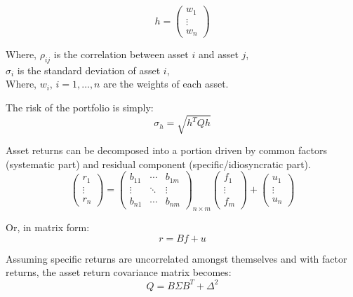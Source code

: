 \documentclass{article}
\begin{document}
\begin{equation}
h = \begin{pmatrix}
w_1 \\
\vdots \\
w_n
\end{pmatrix}
\end{equation}

Where, \( \rho_{ij} \) is the correlation between asset \( i \) and asset \( j \), \\
\( \sigma_i \) is the standard deviation of asset \( i \), \\
Where, \( w_i \), \( i = 1, \ldots, n \) are the weights of each asset.

The risk of the portfolio is simply:
\begin{equation}
    \sigma_h = \sqrt{h^T Q h}
\end{equation}

Asset returns can be decomposed into a portion driven by common factors (systematic part) and residual component (specific/idiosyncratic part).
\begin{equation}
\begin{pmatrix}
r_1 \\
\vdots \\
r_n
\end{pmatrix}
=
\begin{pmatrix}
b_{11} & \cdots & b_{1m} \\
\vdots & \ddots & \vdots \\
b_{n1} & \cdots & b_{nm}
\end{pmatrix}_{n \times m}
\begin{pmatrix}
f_1 \\
\vdots \\
f_m
\end{pmatrix}
+
\begin{pmatrix}
u_1 \\
\vdots \\
u_n
\end{pmatrix}
\end{equation}

Or, in matrix form:
\begin{equation}
r = B f + u
\end{equation}

Assuming specific returns are uncorrelated amongst themselves and with factor returns, the asset return covariance matrix becomes:
\begin{equation}
Q = B \Sigma B^T + \Delta^2
\end{equation}
\end{document}
